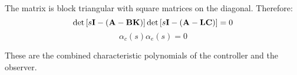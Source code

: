 The matrix is block triangular with square matrices on the diagonal. Therefore:
\[
	\det \left[ {s{\bf{I}} - \left( {{\bf{A}} - {\bf{BK}}} \right)} \right]\det\left[ {s{\bf{I}} - \left( {{\bf{A}} - {\bf{LC}}} \right)} \right] = 0 
\]
\[
	\alpha_c(s)\alpha_e(s) = 0 
\]
 

These are the combined characteristic polynomials of the controller and the observer.


\endinput

